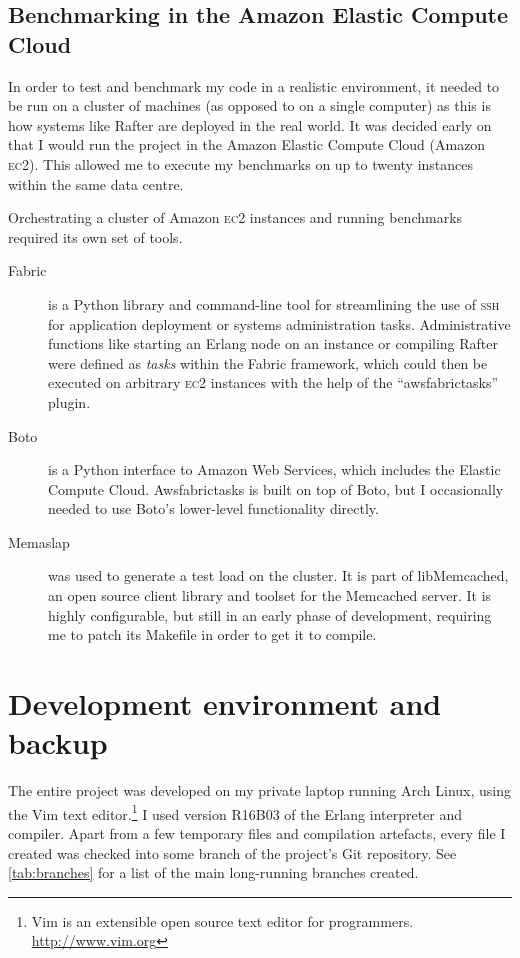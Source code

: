 \documentclass[12pt,chapterprefix=true,toc=bibliography,numbers=noendperiod,
               footnotes=multiple,twoside]{scrreprt}
\newcommand{\ECC}[0]{\textsc{ec}2 }
\begin{document}
\subsection{Benchmarking in the Amazon Elastic Compute Cloud}
\label{ssc:ec2-benchmarking}

In order to test and benchmark my code in a realistic environment, it needed to be run on a cluster of machines (as opposed to on a single computer) as this is how systems like Rafter are deployed in the real world. It was decided early on that I would run the project in the Amazon Elastic Compute Cloud (Amazon \textsc{ec2}). This allowed me to execute my benchmarks on up to twenty instances within the same data centre.

Orchestrating a cluster of Amazon \ECC instances and running benchmarks required its own set of tools.

\begin{description}
    \item[Fabric] is a Python library and command-line tool for streamlining the use of \textsc{ssh} for application deployment or systems administration tasks. Administrative functions like starting an Erlang node on an instance or compiling Rafter were defined as \emph{tasks} within the Fabric framework, which could then be executed on arbitrary \ECC instances with the help of the \enquote{awsfabrictasks} plugin.
    \item[Boto] is a Python interface to Amazon Web Services, which includes the Elastic Compute Cloud. Awsfabrictasks is built on top of Boto, but I occasionally needed to use Boto's lower-level functionality directly.
    \item[Memaslap] was used to generate a test load on the cluster. It is part of libMemcached, an open source client library and toolset for the Memcached server. It is highly configurable, but still in an early phase of development, requiring me to patch its Makefile in order to get it to compile.
\end{description}

\section{Development environment and backup}

The entire project was developed on my private laptop running Arch Linux, using the Vim text editor.\footnote{Vim is an extensible open source text editor for programmers. \url{http://www.vim.org}} I used version R16B03 of the Erlang interpreter and compiler. Apart from a few temporary files and compilation artefacts, every file I created was checked into some branch of the project's Git repository. See \cref{tab:branches} for a list of the main long-running branches created.
\end{document}
